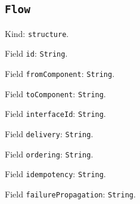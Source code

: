 \documentclass[11pt]{article}
\begin{document}
\subsection*{\texttt{Flow}}
\noindent Kind: \texttt{structure}.\par
\noindent Field \texttt{id}: \texttt{String}.\par
\noindent Field \texttt{fromComponent}: \texttt{String}.\par
\noindent Field \texttt{toComponent}: \texttt{String}.\par
\noindent Field \texttt{interfaceId}: \texttt{String}.\par
\noindent Field \texttt{delivery}: \texttt{String}.\par
\noindent Field \texttt{ordering}: \texttt{String}.\par
\noindent Field \texttt{idempotency}: \texttt{String}.\par
\noindent Field \texttt{failurePropagation}: \texttt{String}.\par
\end{document}
